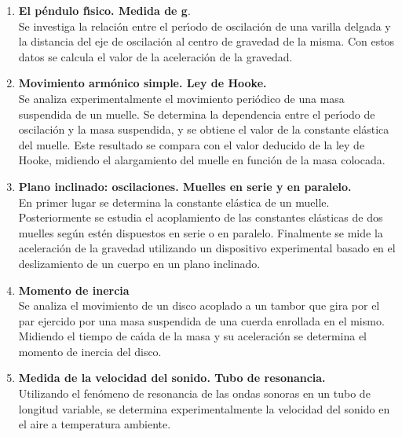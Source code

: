 \begin{enumerate} [{\bf I.}]
\begin{enumerate} [{\bf 1. }]
\item {\bf El p\'{e}ndulo f\'{\i}sico. Medida de g}.\\
Se investiga la relaci\'{o}n entre el per\'{\i}odo de 
oscilaci\'{o}n de una varilla delgada y la distancia del eje de 
oscilaci\'{o}n al centro de gravedad de la misma.
 Con estos datos se calcula el valor de la aceleraci\'{o}n de la gravedad. 
\item {\bf  Movimiento arm\'{o}nico simple. Ley de Hooke.}\\
Se analiza experimentalmente el movimiento
 peri\'{o}dico de una masa suspendida de un muelle.
 Se determina la dependencia entre el per\'{\i}odo de oscilaci\'{o}n
 y la masa suspendida, y se obtiene el valor de la constante
 el\'{a}stica del muelle. Este resultado  se compara con el 
valor deducido de la ley de Hooke, midiendo el alargamiento del 
muelle en funci\'{o}n de la masa colocada.
\item {\bf   Plano inclinado: oscilaciones. Muelles en serie y en paralelo.}\\
En primer lugar se determina la constante el\'{a}stica de un muelle.
 Posteriormente se estudia el acoplamiento de las constantes  
el\'{a}sticas de dos muelles seg\'{u}n est\'{e}n 
dispuestos en serie o en paralelo.
 Finalmente se mide la aceleraci\'{o}n de la gravedad utilizando 
un dispositivo experimental basado en el deslizamiento
 de un cuerpo en un plano inclinado.
\item {\bf Momento de inercia}\\
Se analiza el movimiento de un disco acoplado a un tambor que gira por 
el par  ejercido por una masa suspendida
de una cuerda enrollada en el mismo.
Midiendo el tiempo de ca\'{\i}da de la masa y su aceleraci\'{o}n
se determina el momento de inercia del disco.


\item {\bf   Medida de la velocidad del sonido. Tubo de resonancia.}\\
Utilizando el fen\'{o}meno de resonancia de las ondas sonoras en un 
tubo de longitud variable, se determina experimentalmente 
la velocidad del sonido en el aire a temperatura ambiente.


\end{enumerate}
\end{enumerate}
